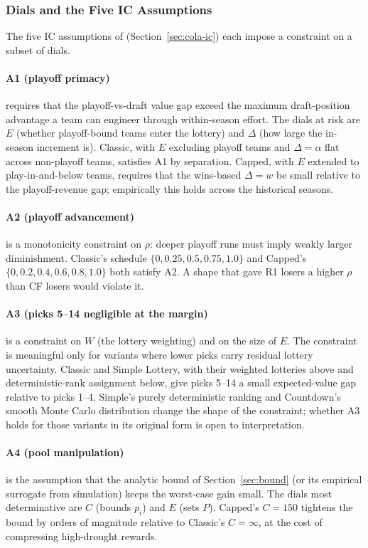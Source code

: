 \subsubsection{Dials and the Five IC Assumptions}
\label{sec:dial-ic}

The five IC assumptions of \citet{highley2026cola} (Section~\ref{sec:cola-ic}) each impose a constraint on a subset of dials.

\paragraph{A1 (playoff primacy)} requires that the playoff-vs-draft value gap exceed the maximum draft-position advantage a team can engineer through within-season effort. The dials at risk are $E$ (whether playoff-bound teams enter the lottery) and $\Delta$ (how large the in-season increment is). Classic, with $E$ excluding playoff teams and $\Delta = \alpha$ flat across non-playoff teams, satisfies A1 by separation. Capped, with $E$ extended to play-in-and-below teams, requires that the wins-based $\Delta = w$ be small relative to the playoff-revenue gap; empirically this holds across the historical seasons.

\paragraph{A2 (playoff advancement)} is a monotonicity constraint on $\rho$: deeper playoff runs must imply weakly larger diminishment. Classic's schedule $\{0, 0.25, 0.5, 0.75, 1.0\}$ and Capped's $\{0, 0.2, 0.4, 0.6, 0.8, 1.0\}$ both satisfy A2. A shape that gave R1 losers a higher $\rho$ than CF losers would violate it.

\paragraph{A3 (picks 5--14 negligible at the margin)} is a constraint on $W$ (the lottery weighting) and on the size of $E$. The constraint is meaningful only for variants where lower picks carry residual lottery uncertainty. Classic and Simple Lottery, with their weighted lotteries above and deterministic-rank assignment below, give picks 5--14 a small expected-value gap relative to picks 1--4. Simple's purely deterministic ranking and Countdown's smooth Monte Carlo distribution change the shape of the constraint; whether A3 holds for those variants in its original form is open to interpretation.

\paragraph{A4 (pool manipulation)} is the assumption that the analytic bound of Section~\ref{sec:bound} (or its empirical surrogate from simulation) keeps the worst-case gain small. The dials most determinative are $C$ (bounds $p_i$) and $E$ (sets $P$). Capped's $C = 150$ tightens the bound by orders of magnitude relative to Classic's $C = \infty$, at the cost of compressing high-drought rewards.

